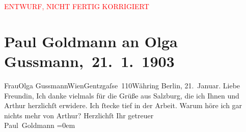 
\begin{center}
            \textcolor{red}{ENTWURF, NICHT FERTIG KORRIGIERT}
                      \end{center}
            
         
         \renewcommand{\erwaehntePersonen}{Personen: Olga Schnitzler}
         \renewcommand{\erwaehnteOrte}{Orte: Berlin, Salzburg, Wien}
         \renewcommand{\erwaehnteWerke}{}
               \section[ Paul Goldmann an Olga Gussmann, 21. 1. 1903]{ Paul Goldmann an Olga Gussmann, 21. 1. 1903}\nopagebreak{}\rehead{ }\begin{ledgroupsized}[t]{13cm}\normalsize\beginnumbering \toendnotes[C]{\smallbreak\pagebreak[2]} 
\pstart{}{\pb}Frau\pend{}\pstart{}Olga Gussmann\pend{}\pstart{}Wien\pend{}\pstart{}Gentzgaſse 110\pend{}\pstart{}Währing\pend{}{\bigskip}\pstart
           {\pb}Berlin, 21. Januar.\pend
           { }\pstart{}Liebe Freundin,\pend\pstart
           Ich danke vielmals für die Grüße aus Salzburg, die ich
               Ihnen und Arthur herzlichſt erwidere. Ich
               ſtecke tief in der Arbeit. Warum höre ich gar nichts mehr von Arthur?\pend
           \pstart
           Herzlichſt Ihr getreuer {\\[\baselineskip]}\spacefill\mbox{Paul Goldmann}\pend
           \leftskip=0em{}
         
         \endnumbering{}\end{ledgroupsized}\begin{anhang}\end{anhang}\newcommand{\dateiname}{L03529}\newcommand{\titel}{Paul Goldmann an Olga Gussmann, 21. 1. 1903}\newcommand{\editorInnen}{Martin Anton Müller und Laura Untner}
      
